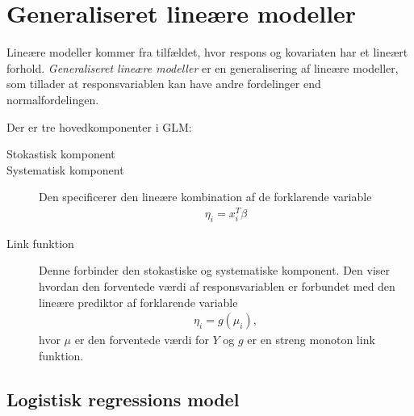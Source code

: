 \section{Generaliseret lineære modeller}
Lineære modeller kommer fra tilfældet, hvor respons og kovariaten har et lineært forhold. 
\textit{Generaliseret lineære modeller} er en generalisering af lineære modeller, som tillader at responsvariablen kan have andre fordelinger end normalfordelingen.

Der er tre hovedkomponenter i GLM:
\begin{description}
\item[Stokastisk komponent] 

\item[Systematisk komponent] 
Den specificerer den lineære kombination af de forklarende variable
\begin{align*}
\eta_i = x_i^T \beta
\end{align*}
\item[Link funktion]
Denne forbinder den stokastiske og systematiske komponent. Den viser hvordan den forventede værdi af responsvariablen er forbundet med den lineære prediktor af forklarende variable
\begin{align*}
\eta_i=g(\mu_i),
\end{align*} 
hvor $\mu$ er den forventede værdi for $Y$ og $g$ er en streng monoton link funktion.
\end{description}

\subsection{Logistisk regressions model}


